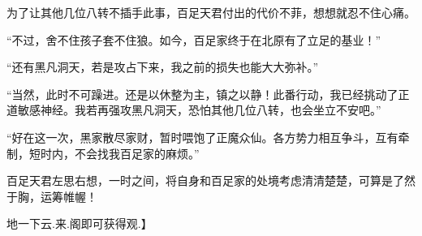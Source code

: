 \begin{this_body}
为了让其他几位八转不插手此事，百足天君付出的代价不菲，想想就忍不住心痛。

“不过，舍不住孩子套不住狼。如今，百足家终于在北原有了立足的基业！”

“还有黑凡洞天，若是攻占下来，我之前的损失也能大大弥补。”

“当然，此时不可躁进。还是以休整为主，镇之以静！此番行动，我已经挑动了正道敏感神经。我若再强攻黑凡洞天，恐怕其他几位八转，也会坐立不安吧。”

“好在这一次，黑家散尽家财，暂时喂饱了正魔众仙。各方势力相互争斗，互有牵制，短时内，不会找我百足家的麻烦。”

百足天君左思右想，一时之间，将自身和百足家的处境考虑清清楚楚，可算是了然于胸，运筹帷幄！

地一下云.来.阁即可获得观.】

\end{this_body}

